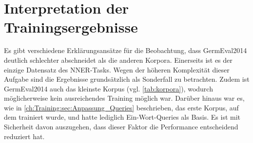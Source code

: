 \begin{table}[!htbp]
	\centering
	\caption{Evaluation des MRC-Frameworks}
	\label{tab:evaluation}
\end{table}

\section{Interpretation der Trainingsergebnisse}
\label{ch:Evaluation:sec:Interpretation_der_Trainingsergebnisse}

Es gibt verschiedene Erklärungsansätze für die Beobachtung, dass GermEval2014 deutlich schlechter abschneidet als die anderen Korpora. Einerseits ist es der einzige Datensatz des NNER-Tasks. Wegen der höheren Komplexität dieser Aufgabe sind die Ergebnisse grundsätzlich als Sonderfall zu betrachten. Zudem ist GermEval2014 auch das kleinste Korpus (vgl. \autoref{tab:korpora}), wodurch möglicherweise kein ausreichendes Training möglich war. Darüber hinaus war es, wie in \autoref{ch:Training:sec:Anpassung_Queries} beschrieben, das erste Korpus, auf dem trainiert wurde, und hatte lediglich Ein-Wort-Queries als Basis. Es ist mit Sicherheit davon auszugehen, dass dieser Faktor die Performance entscheidend reduziert hat.

